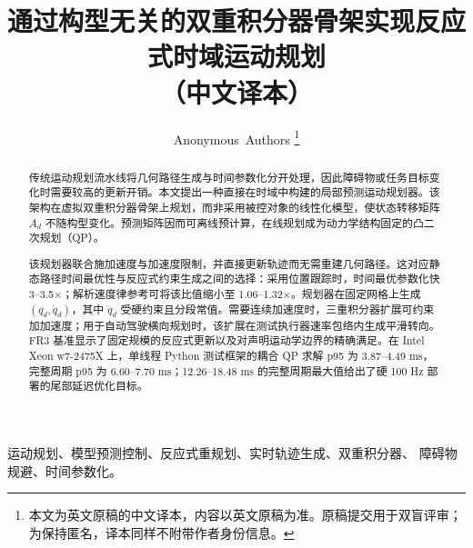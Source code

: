 \documentclass[conference]{IEEEtran}
\begin{document}
\title{通过构型无关的双重积分器骨架实现反应式时域运动规划\\[2pt]\large（中文译本）}

\author{Anonymous~Authors%
\thanks{本文为英文原稿的中文译本，内容以英文原稿为准。原稿提交用于双盲评审；为保持匿名，译本同样不附带作者身份信息。}%
}

\maketitle
\thispagestyle{empty}
\pagestyle{empty}

\begin{abstract}
传统运动规划流水线将几何路径生成与时间参数化分开处理，因此障碍物或任务目标变化时需要较高的更新开销。本文提出一种直接在时域中构建的局部预测运动规划器。该架构在虚拟双重积分器骨架上规划，而非采用被控对象的线性化模型，使状态转移矩阵 $A_d$ 不随构型变化。预测矩阵因而可离线预计算，在线规划成为动力学结构固定的凸二次规划（QP）。

该规划器联合施加速度与加速度限制，并直接更新轨迹而无需重建几何路径。这对应静态路径时间最优性与反应式约束生成之间的选择：采用位置跟踪时，时间最优参数化快 3--3.5$\times$；解析速度律参考可将该比值缩小至 1.06--1.32$\times$。规划器在固定网格上生成 $(q_d,\dot q_d)$，其中 $\ddot q_d$ 受硬约束且分段常值。需要连续加速度时，三重积分器扩展可约束加加速度；用于自动驾驶横向规划时，该扩展在测试执行器速率包络内生成平滑转向。FR3 基准显示了固定规模的反应式更新以及对声明运动学边界的精确满足。在 Intel Xeon w7-2475X 上，单线程 Python 测试框架的耦合 QP 求解 p95 为 3.87--4.49 ms，完整周期 p95 为 6.60--7.70 ms；12.26--18.48 ms 的完整周期最大值给出了硬 100 Hz 部署的尾部延迟优化目标。
\end{abstract}

\begin{IEEEkeywords}
运动规划、模型预测控制、反应式重规划、实时轨迹生成、双重积分器、
障碍物规避、时间参数化。
\end{IEEEkeywords}



\end{document}
